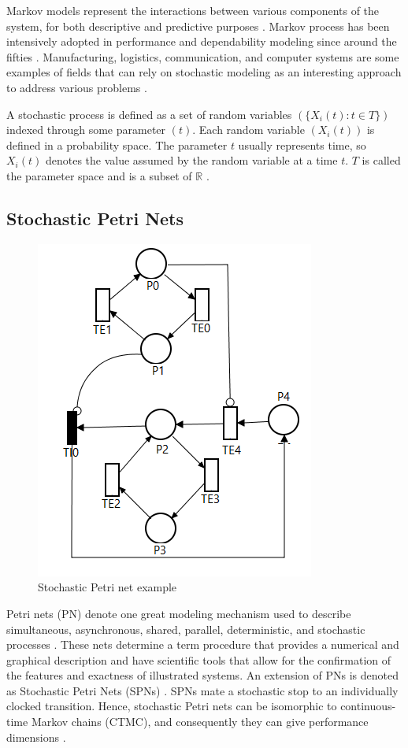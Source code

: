 \documentclass[conference]{IEEEtran}
\begin{document}
Markov models represent the interactions between various components of the system, for both descriptive and predictive purposes \citep{daniel2004performance}. Markov process has been intensively adopted in performance and dependability modeling since around the fifties \citep{maciel2012dependability}. Manufacturing, logistics, communication, and computer systems are some examples of fields that can rely on stochastic modeling as an interesting approach to address various problems \citep{maciel2021survey}.

A stochastic process is defined as a set of random variables $(\{ X_{i}(t):t \in T \})$ indexed through some parameter $(t)$. Each random variable $(X_i(t))$ is defined in a probability space. The parameter $t$ usually represents time, so $X_{i}(t)$ denotes the value assumed by the random variable at a time $t$. $T$  is called the parameter space and is a subset of $\mathbb{R}$ \citep{maciel2021survey}.

\subsection{Stochastic Petri Nets}

\begin{figure}[htbp]
\centerline{\includegraphics[scale=0.75]{img/cold-standby-example.png}}
\caption{Stochastic Petri net example}
\label{fig:stochastic_petri_net_example}
\end{figure}

Petri nets (PN) denote one great modeling mechanism used to describe simultaneous, asynchronous, shared, parallel, deterministic, and stochastic processes \citep{german2000performance}. These nets determine a term procedure that provides a numerical and graphical description and have scientific tools that allow for the confirmation of the features and exactness of illustrated systems. An extension of PNs is denoted as Stochastic Petri Nets (SPNs) \citep{marsan1998modelling}. SPNs mate a stochastic stop to an individually clocked transition. Hence, stochastic Petri nets can be isomorphic to continuous-time Markov chains (CTMC), and consequently they can give performance dimensions \citep{molloy1982integration}.
\end{document}
